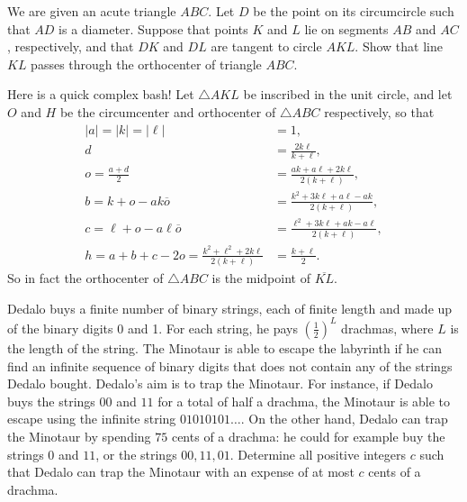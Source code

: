 \documentclass[11pt]{article}
\theoremstyle{definition}
\begin{document}
\begin{question}[name={2023 EGMO, \href{https://artofproblemsolving.com/community/c6h3054414p27523016}{Problem 2}}]
	We are given an acute triangle $ABC$. Let $D$ be the point on its circumcircle such that $AD$ is a diameter. Suppose that points $K$ and $L$ lie on segments $AB$ and $AC$, respectively, and that $DK$ and $DL$ are tangent to circle $AKL$.
	Show that line $KL$ passes through the orthocenter of triangle $ABC$.	
\end{question}


\begin{solution}[name={Solution by Matthew Kroesche}]
	Here is a quick complex bash! Let $\triangle AKL$ be inscribed in the unit circle, and let $O$ and $H$ be the circumcenter and orthocenter of $\triangle ABC$ respectively, so that
	\begin{align*}
		|a|=|k|=|\ell|&=1, \\
		d &= \frac{2k\ell}{k+\ell}, \\
		o = \frac{a+d}2 &= \frac{ak+a\ell+2k\ell}{2(k+\ell)}, \\
		b = k + o - ak\overline{o} &= \frac{k^2+3k\ell+a\ell-ak}{2(k+\ell)}, \\
		c = \ell + o - a\ell\overline{o} &= \frac{\ell^2+3k\ell+ak-a\ell}{2(k+\ell)},\\
		h = a+b+c-2o = \frac{k^2+\ell^2+2k\ell}{2(k+\ell)} &= \frac{k+\ell}2.
	\end{align*}So in fact the orthocenter of $\triangle ABC$ is the midpoint of $\overline{KL}$.
\end{solution}



\begin{question}[name={2023 Italy Math Olympiad, \href{https://artofproblemsolving.com/community/c6h3067509p27681162}{Problem 6}}]
	Dedalo buys a finite number of binary strings, each of finite length and made up of the binary digits 0 and 1. For each string, he pays $(\frac{1}{2})^L$ drachmas, where $L$ is the length of the string. The Minotaur is able to escape the labyrinth if he can find an infinite sequence of binary digits that does not contain any of the strings Dedalo bought. Dedalo’s aim is to trap the Minotaur.
	For instance, if Dedalo buys the strings $00$ and $11$ for a total of half a drachma, the Minotaur is able to escape using the infinite string $01010101 \ldots$.
	On the other hand, Dedalo can trap the Minotaur by spending $75$ cents of a drachma: he could for example buy the strings $0$ and $11$, or the strings $00, 11, 01$.
	Determine all positive integers $c$ such that Dedalo can trap the Minotaur with an expense of at most $c$ cents of a drachma.
\end{question}
\end{document}
